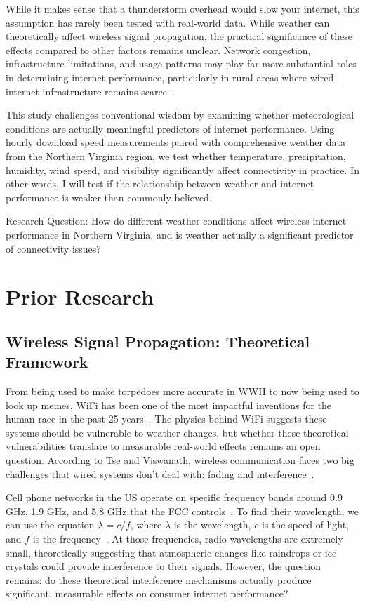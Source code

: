 \documentclass[11pt]{report}
\begin{document}
While it makes sense that a thunderstorm overhead would slow your internet, this assumption has rarely been tested with real-world data. While weather can theoretically affect wireless signal propagation, the practical significance of these effects compared to other factors remains unclear. Network congestion, infrastructure limitations, and usage patterns may play far more substantial roles in determining internet performance, particularly in rural areas where wired internet infrastructure remains scarce~\cite{changelabsolutions2024broadband}.

This study challenges conventional wisdom by examining whether meteorological conditions are actually meaningful predictors of internet performance. Using hourly download speed measurements paired with comprehensive weather data from the Northern Virginia region, we test whether temperature, precipitation, humidity, wind speed, and visibility significantly affect connectivity in practice. In other words, I will test if the relationship between weather and internet performance is weaker than commonly believed.

Research Question: How do different weather conditions affect wireless internet performance in Northern Virginia, and is weather actually a significant predictor of connectivity issues?

\chapter{Prior Research}

\section{Wireless Signal Propagation: Theoretical Framework}

From being used to make torpedoes more accurate in WWII to now being used to look up memes, WiFi has been one of the most impactful inventions for the human race in the past 25 years~\cite{wifinowglobal_wifi_invention}. The physics behind WiFi suggests these systems should be vulnerable to weather changes, but whether these theoretical vulnerabilities translate to measurable real-world effects remains an open question. According to Tse and Viswanath, wireless communication faces two big challenges that wired systems don't deal with: fading and interference~\cite{tse2005fundamentals}.

Cell phone networks in the US operate on specific frequency bands around 0.9 GHz, 1.9 GHz, and 5.8 GHz that the FCC controls~\cite{tse2005fundamentals}. To find their wavelength, we can use the equation $\lambda = c/f$, where $\lambda$ is the wavelength, $c$ is the speed of light, and $f$ is the frequency~\cite{commsbrief2024wavelength}. At those frequencies, radio wavelengths are extremely small, theoretically suggesting that atmospheric changes like raindrops or ice crystals could provide interference to their signals. However, the question remains: do these theoretical interference mechanisms actually produce significant, measurable effects on consumer internet performance?
\end{document}
